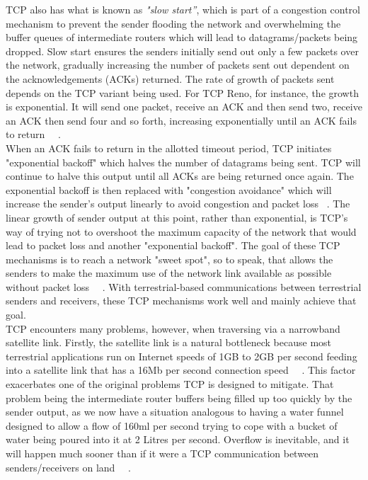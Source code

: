 TCP also has what is known as \emph{"slow start”}, which is part of a congestion control mechanism to prevent the sender flooding the network and overwhelming the buffer queues of intermediate routers which will lead to datagrams/packets being dropped. Slow start ensures the senders initially send out only a few packets over the network, gradually increasing the number of packets sent out dependent on the acknowledgements (ACKs) returned. The rate of growth of packets sent depends on the TCP variant being used. For TCP Reno, for instance, the growth is exponential. It will send one packet, receive an ACK and then send two, receive an ACK then send four and so forth, increasing exponentially until an ACK fails to return ~\cite{1}~\cite{12}. \\

When an ACK fails to return in the allotted timeout period, TCP initiates "exponential backoff" which halves the number of datagrams being sent. TCP will continue to halve this output until all ACKs are being returned once again. The exponential backoff is then replaced with "congestion avoidance" which will increase the sender's output linearly to avoid congestion and packet loss ~\cite{1}. The linear growth of sender output at this point, rather than exponential, is TCP's way of trying not to overshoot the maximum capacity of the network that would lead to packet loss and another "exponential backoff". The goal of these TCP mechanisms is to reach a network "sweet spot", so to speak, that allows the senders to make the maximum use of the network link available as possible without packet loss ~\cite{1}~\cite{12}. With terrestrial-based communications between terrestrial senders and receivers, these TCP mechanisms work well and mainly achieve that goal. \\

TCP encounters many problems, however, when traversing via a narrowband satellite link. Firstly, the satellite link is a natural bottleneck because most terrestrial applications run on Internet speeds of 1GB to 2GB per second feeding into a satellite link that has a 16Mb per second connection speed ~\cite{4}~\cite{5}. This factor exacerbates one of the original problems TCP is designed to mitigate. That problem being the intermediate router buffers being filled up too quickly by the sender output, as we now have a situation analogous to having a water funnel designed to allow a flow of 160ml per second trying to cope with a bucket of water being poured into it at 2 Litres per second. Overflow is inevitable, and it will happen much sooner than if it were a TCP communication between senders/receivers on land ~\cite{8}~\cite{10}. \\

